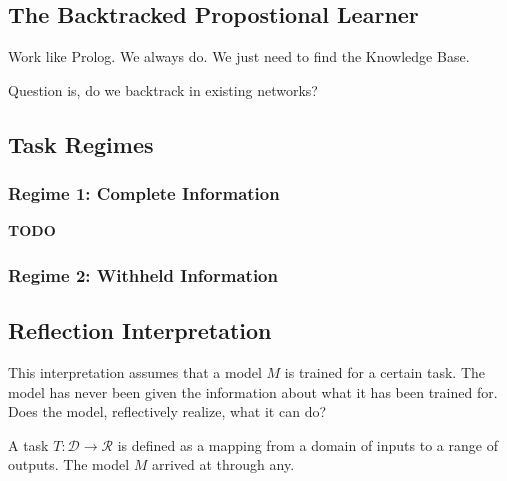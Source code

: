 \documentclass{article}
\begin{document}
\subsection{The Backtracked Propostional Learner}
Work like Prolog. We always do. We just need to find the Knowledge Base.

Question is, do we backtrack in existing networks?





\subsection{Task Regimes}

\subsubsection{Regime 1: Complete Information}
%
%

\textbf{TODO}

\subsubsection{Regime 2: Withheld Information}
%

\subsection{Reflection Interpretation}
This interpretation assumes that a model $M$ is trained for a certain task.
The model has never been given the information about what it has been trained
for. Does the model, reflectively realize, what it can do?

A task $T: \mathcal{D} \rightarrow \mathcal{R}$ is defined as a mapping from a
domain of inputs to a range of outputs. The model $M$ arrived at through any.
\end{document}
